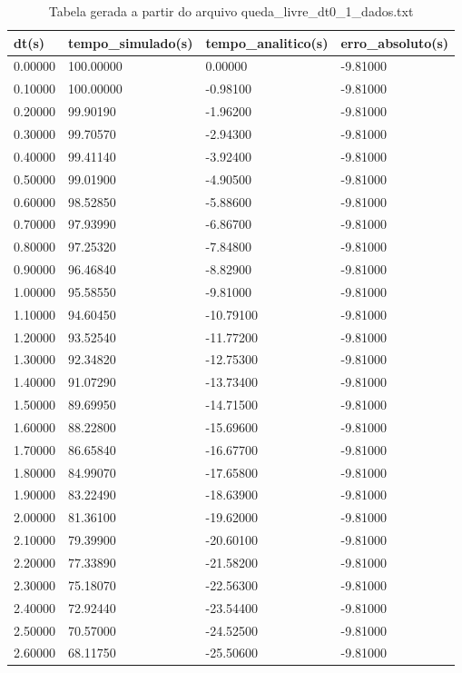 \begin{table}
\caption{Tabela gerada a partir do arquivo queda_livre_dt0_1_dados.txt}
\label{tab:queda_livre_dt0_1_dados}
\begin{tabular}{llll}
\toprule
dt(s) & tempo_simulado(s) & tempo_analitico(s) & erro_absoluto(s) \\
\midrule
0.00000 & 100.00000 & 0.00000 & -9.81000 \\
0.10000 & 100.00000 & -0.98100 & -9.81000 \\
0.20000 & 99.90190 & -1.96200 & -9.81000 \\
0.30000 & 99.70570 & -2.94300 & -9.81000 \\
0.40000 & 99.41140 & -3.92400 & -9.81000 \\
0.50000 & 99.01900 & -4.90500 & -9.81000 \\
0.60000 & 98.52850 & -5.88600 & -9.81000 \\
0.70000 & 97.93990 & -6.86700 & -9.81000 \\
0.80000 & 97.25320 & -7.84800 & -9.81000 \\
0.90000 & 96.46840 & -8.82900 & -9.81000 \\
1.00000 & 95.58550 & -9.81000 & -9.81000 \\
1.10000 & 94.60450 & -10.79100 & -9.81000 \\
1.20000 & 93.52540 & -11.77200 & -9.81000 \\
1.30000 & 92.34820 & -12.75300 & -9.81000 \\
1.40000 & 91.07290 & -13.73400 & -9.81000 \\
1.50000 & 89.69950 & -14.71500 & -9.81000 \\
1.60000 & 88.22800 & -15.69600 & -9.81000 \\
1.70000 & 86.65840 & -16.67700 & -9.81000 \\
1.80000 & 84.99070 & -17.65800 & -9.81000 \\
1.90000 & 83.22490 & -18.63900 & -9.81000 \\
2.00000 & 81.36100 & -19.62000 & -9.81000 \\
2.10000 & 79.39900 & -20.60100 & -9.81000 \\
2.20000 & 77.33890 & -21.58200 & -9.81000 \\
2.30000 & 75.18070 & -22.56300 & -9.81000 \\
2.40000 & 72.92440 & -23.54400 & -9.81000 \\
2.50000 & 70.57000 & -24.52500 & -9.81000 \\
2.60000 & 68.11750 & -25.50600 & -9.81000 \\

\end{tabular}
\end{table}
